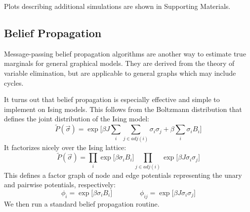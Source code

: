 \documentclass{article}
\begin{document}
Plots describing additional simulations are shown in Supporting Materials. 





\subsection{Belief Propagation}





Message-passing belief propagation algorithms are another way to estimate true 
marginals for general graphical models. 
They are derived from the theory of variable elimination, but are applicable to 
general graphs which may include cycles. 

It turns out that belief propagation is especially effective and simple to 
implement on Ising models. 
This follows from the Boltzmann distribution that defines the joint distribution 
of the Ising model:
\begin{equation}\label{isingJoint}
    \tilde{P}(\vec{\sigma}) = \exp \Bigr [\beta J\sum_i \sum_{j \in adj(i)} \sigma_i \sigma_j + \beta \sum_i \sigma_i B_i \Bigr ]
\end{equation}
It factorizes nicely over the Ising lattice:
\begin{equation}\label{gibbsFactorization}
    \tilde{P}(\vec{\sigma}) = \prod_i \exp \Bigr [\beta \sigma_i B_i \Bigr ] \prod_{j \in adj(i)} \exp \Bigr [ \beta J \sigma_i \sigma_j \Bigr ]
\end{equation}
This defines a factor graph of node and edge potentials representing the unary 
and pairwise potentials, respectively:
\[
    \phi_i = \exp \Bigr [\beta \sigma_i B_i \Bigr ]
    \qquad \qquad
    \phi_{ij} = \exp \Bigr [ \beta J \sigma_i \sigma_j \Bigr ]
\]
We then run a standard belief propagation routine. 
\end{document}
